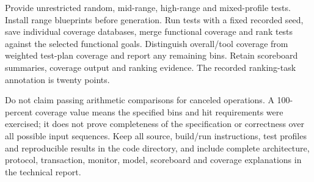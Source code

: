 \documentclass[11pt,a4paper]{article}
\begin{document}
Provide unrestricted random, mid-range, high-range and mixed-profile tests. Install range blueprints before generation. Run tests with a fixed recorded seed, save individual coverage databases, merge functional coverage and rank tests against the selected functional goals. Distinguish overall/\allowbreak{}tool coverage from weighted test-plan coverage and report any remaining bins. Retain scoreboard summaries, coverage output and ranking evidence. The recorded ranking-task annotation is twenty points.


Do not claim passing arithmetic comparisons for canceled operations. A 100-percent coverage value means the specified bins and hit requirements were exercised;\allowbreak{} it does not prove completeness of the specification or correctness over all possible input sequences. Keep all source, build/\allowbreak{}run instructions, test profiles and reproducible results in the code directory, and include complete architecture, protocol, transaction, monitor, model, scoreboard and coverage explanations in the technical report.
\end{document}

